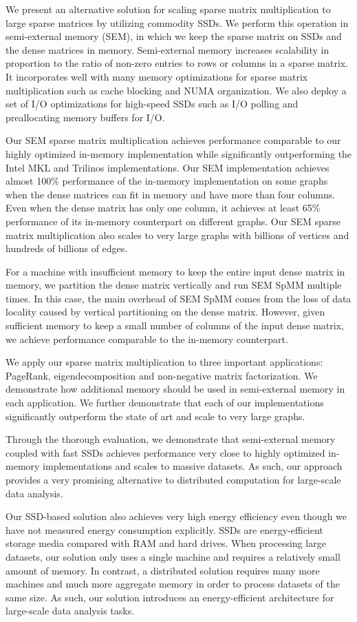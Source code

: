 We present an alternative solution for scaling sparse matrix multiplication
to large sparse matrices by utilizing commodity SSDs. We perform this operation
in semi-external memory (SEM), in which
we keep the sparse matrix on SSDs and the dense matrices in memory. Semi-external
memory increases scalability in proportion to the ratio of non-zero entries
to rows or columns in a sparse matrix. It incorporates well with many memory
optimizations for sparse matrix multiplication such as cache blocking and NUMA
organization. We also deploy a set of I/O optimizations for high-speed SSDs
such as I/O polling and preallocating memory buffers for I/O.

Our SEM sparse matrix multiplication achieves performance comparable
to our highly optimized in-memory implementation while significantly outperforming
the Intel MKL and
Trilinos implementations. Our SEM implementation achieves almost 100\% performance
of the in-memory implementation on some graphs when the dense matrices can fit
in memory and have more than four columns. Even when the dense matrix has only
one column, it achieves at least 65\% performance of its in-memory counterpart
on different graphs. Our SEM sparse matrix multiplication also scales to very
large graphs with billions of vertices and hundreds of billions of edges.

For a machine with insufficient memory to keep the entire input dense matrix
in memory, we partition the dense matrix vertically and run SEM SpMM multiple
times. In this case, the main overhead of SEM SpMM comes from the loss of
data locality caused by vertical partitioning on the dense matrix. However,
given sufficient memory to keep a small number of columns of the input dense
matrix, we achieve performance comparable to the in-memory counterpart.

We apply our sparse matrix multiplication to three important applications:
PageRank, eigendecomposition and non-negative matrix factorization. We demonstrate
how additional memory should be used in semi-external memory in each application.
We further demonstrate that each of our implementations significantly outperform
the state of art and scale to very large graphs.

Through the thorough evaluation, we demonstrate that semi-external memory
coupled with fast SSDs achieves performance very close to highly optimized
in-memory implementations and scales to massive datasets.
As such, our approach provides a very promising alternative to distributed
computation for large-scale data analysis.

Our SSD-based solution also achieves very high energy efficiency even though
we have not measured energy consumption explicitly. SSDs are energy-efficient
storage media \cite{Tsirogiannis} compared with RAM and hard drives.
When processing large datasets, our solution only uses
a single machine and requires a relatively small amount of memory. In contrast,
a distributed solution requires many more machines and much more aggregate
memory in order to process datasets of the same size. As such, our solution
introduces an energy-efficient architecture for large-scale data analysis tasks.
